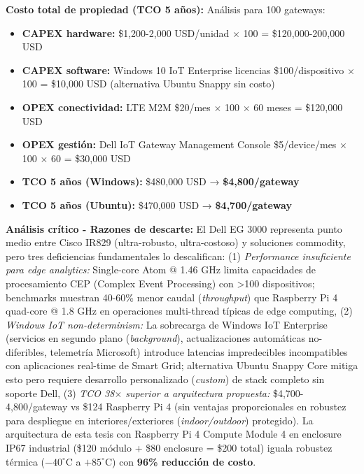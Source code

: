 \textbf{Costo total de propiedad (TCO 5 años):} Análisis para 100 gateways:

\begin{itemize}
\item \textbf{CAPEX hardware:} \$1,200-2,000 USD/unidad $\times$ 100 = \$120,000-200,000 USD
\item \textbf{CAPEX software:} Windows 10 IoT Enterprise licencias \$100/dispositivo $\times$ 100 = \$10,000 USD (alternativa Ubuntu Snappy sin costo)
\item \textbf{OPEX conectividad:} LTE M2M \$20/mes $\times$ 100 $\times$ 60 meses = \$120,000 USD
\item \textbf{OPEX gestión:} Dell IoT Gateway Management Console \$5/device/mes $\times$ 100 $\times$ 60 = \$30,000 USD
\item \textbf{TCO 5 años (Windows):} \$480,000 USD → \textbf{\$4,800/gateway}
\item \textbf{TCO 5 años (Ubuntu):} \$470,000 USD → \textbf{\$4,700/gateway}
\end{itemize}

\textbf{Análisis crítico - Razones de descarte:} El Dell EG 3000 representa punto medio entre Cisco IR829 (ultra-robusto, ultra-costoso) y soluciones commodity, pero tres deficiencias fundamentales lo descalifican: (1) \textit{Performance insuficiente para edge analytics:} Single-core Atom @ 1.46 GHz limita capacidades de procesamiento CEP (Complex Event Processing) con >100 dispositivos; benchmarks muestran 40-60\% menor caudal (\textit{throughput}) que Raspberry Pi 4 quad-core @ 1.8 GHz en operaciones multi-thread típicas de edge computing, (2) \textit{Windows IoT non-determinism:} La sobrecarga de Windows IoT Enterprise (servicios en segundo plano (\textit{background}), actualizaciones automáticas no-diferibles, telemetría Microsoft) introduce latencias impredecibles incompatibles con aplicaciones real-time de Smart Grid; alternativa Ubuntu Snappy Core mitiga esto pero requiere desarrollo personalizado (\textit{custom}) de stack completo sin soporte Dell, (3) \textit{TCO 38$\times$ superior a arquitectura propuesta:} \$4,700-4,800/gateway vs \$124 Raspberry Pi 4 (sin ventajas proporcionales en robustez para despliegue en interiores/exteriores (\textit{indoor/outdoor}) protegido). La arquitectura de esta tesis con Raspberry Pi 4 Compute Module 4 en enclosure IP67 industrial (\$120 módulo + \$80 enclosure = \$200 total) iguala robustez térmica ($-40^\circ$C a $+85^\circ$C) con \textbf{96\% reducción de costo}.

